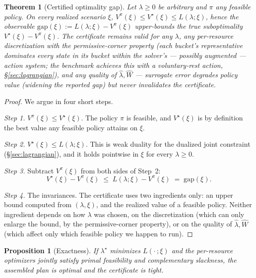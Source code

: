 \documentclass[11pt]{article}
\newtheorem{theorem}{Theorem}
\newtheorem{proposition}{Proposition}
\newcommand{\Vstar}{V^{\star}}
\begin{document}
\begin{theorem}[Certified optimality gap]
\label{thm:cert}
Let $\lambda \geq 0$ be arbitrary and $\pi$ any feasible policy. On
every realized scenario $\xi$,
$V^{\pi}(\xi) \leq \Vstar(\xi) \leq L(\lambda; \xi)$, hence the
observable $\mathrm{gap}(\xi) := L(\lambda; \xi) - V^{\pi}(\xi)$
upper-bounds the true suboptimality $\Vstar(\xi) - V^{\pi}(\xi)$. The
certificate remains valid for any $\lambda$, any per-resource
discretization with the permissive-corner property (each bucket's
representative dominates every state in its bucket \emph{within the
solver's --- possibly augmented --- action system}; the benchmark
achieves this with a voluntary-rest action, \S\ref{sec:lagrangian}),
and any quality of
$\hat{\lambda}, \widehat{W}$ --- surrogate error degrades policy value
(widening the reported gap) but never invalidates the certificate.
\end{theorem}

\begin{proof}
We argue in four short steps.

\emph{Step 1.} $V^{\pi}(\xi) \leq \Vstar(\xi)$. The policy $\pi$
is feasible, and $\Vstar(\xi)$ is by definition the best value any
feasible policy attains on $\xi$.

\emph{Step 2.} $\Vstar(\xi) \leq L(\lambda; \xi)$. This is weak
duality for the dualized joint constraint (\S\ref{sec:lagrangian}),
and it holds pointwise in $\xi$ for every $\lambda \geq 0$.

\emph{Step 3.} Subtract $V^{\pi}(\xi)$ from both sides of Step~2:
\[
  \Vstar(\xi) - V^{\pi}(\xi) \;\leq\; L(\lambda; \xi) - V^{\pi}(\xi)
  \;=\; \mathrm{gap}(\xi).
\]

\emph{Step 4.} The invariances. The certificate uses two ingredients
only: an upper bound computed from $(\lambda, \xi)$, and the realized
value of a feasible policy. Neither ingredient depends on how $\lambda$
was chosen, on the discretization (which can only enlarge the bound,
by the permissive-corner property), or on the quality of
$\hat{\lambda}, \widehat{W}$ (which affect only which feasible policy
we happen to run).
\end{proof}

\begin{proposition}[Exactness]
\label{prop:exact}
If $\lambda^{\star}$ minimizes $L(\cdot\,; \xi)$ and the per-resource
optimizers jointly satisfy primal feasibility and complementary
slackness, the assembled plan is optimal and the certificate is tight.
\end{proposition}
\end{document}
